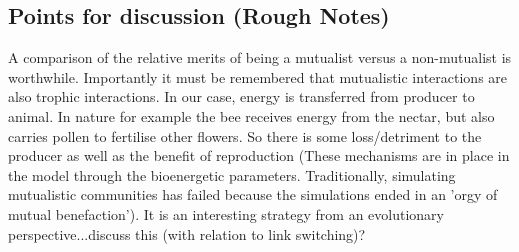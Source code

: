 \begin{itemize}
{}


\section{Points for discussion (Rough Notes)}

A comparison of the relative merits of being a mutualist versus a non-mutualist is worthwhile. Importantly it must be remembered that mutualistic interactions are also trophic interactions. In our case, energy is transferred from producer to animal. In nature for example the bee receives energy from the nectar, but also carries pollen to fertilise other flowers.  So there is some loss/detriment to the producer as well as the benefit of reproduction (These mechanisms are in place in the model through the bioenergetic parameters. Traditionally, simulating mutualistic communities has failed because the simulations ended in an 'orgy of mutual benefaction'). It is an interesting strategy from an evolutionary perspective...discuss this (with relation to link switching)?



\end{itemize}
